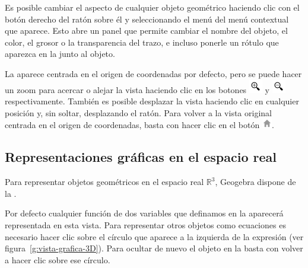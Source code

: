 Es posible cambiar el aspecto de cualquier objeto geométrico haciendo clic con el botón derecho del ratón sobre él y seleccionando el menú  del menú contextual que aparece.
Esto abre un panel que permite cambiar el nombre del objeto, el color, el grosor o la transparencia del trazo, e incluso ponerle un rótulo que aparezca en la  junto al objeto.

La  aparece centrada en el origen de coordenadas por defecto, pero se puede hacer un zoom para acercar o alejar la vista haciendo clic en los botones \includegraphics[scale=0.03]{img/introduccion/zoom-in-button} y \includegraphics[scale=0.03]{img/introduccion/zoom-out-button} respectivamente.
También es posible desplazar la vista haciendo clic en cualquier posición y, sin soltar, desplazando el ratón.
Para volver a la vista original centrada en el origen de coordenadas, basta con hacer clic en el botón \includegraphics[scale=0.03]{img/introduccion/home-button}.


\subsection*{Representaciones gráficas en el espacio real}
Para representar objetos geométricos en el espacio real $\mathbb{R}^3$, Geogebra dispone de la .

Por defecto cualquier función de dos variables que definamos en la  aparecerá representada en esta vista.
Para representar otros objetos como ecuaciones es necesario hacer clic sobre el círculo que aparece a la izquierda de la expresión (ver figura~\ref{g:vista-grafica-3D}).
Para ocultar de nuevo el objeto en la  basta con volver a hacer clic sobre ese círculo.

